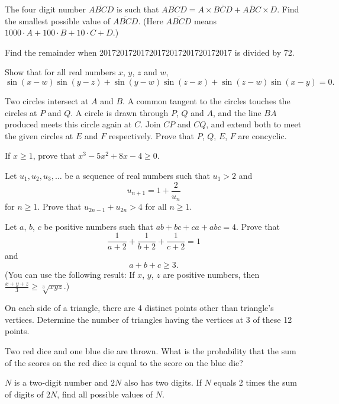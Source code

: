 \begin{problems}
    \problem The four digit number $\overline{ABCD}$ is such that
    $\overline{ABCD} = A \times \overline{BCD} + \overline{ABC} \times D$. Find
    the smallest possible value of $\overline{ABCD}$. (Here $\overline{ABCD}$
    means $1000 \cdot A + 100 \cdot B + 10 \cdot C + D$.)
    
    \problem Find the remainder when 20172017201720172017201720172017 is
    divided by 72. 
    
    \problem Show that for all real numbers $x$, $y$, $z$ and $w$, \[\sin(x -
    w)\sin(y - z) + \sin(y - w)\sin(z - x) + \sin(z - w)\sin(x - y) = 0.\]
    
    \problem Two circles intersect at $A$ and $B$. A common tangent to the
    circles touches the circles at $P$ and $Q$. A circle is drawn through $P$,
    $Q$ and $A$, and the line $BA$ produced meets this circle again at $C$.
    Join $CP$ and $CQ$, and extend both to meet the given circles at $E$ and
    $F$ respectively. Prove that $P$, $Q$, $E$, $F$ are concyclic. 
    
    \problem If $x \geq 1$, prove that $x^3 - 5x^2 + 8x - 4 \geq 0$. 
    
    \problem Let $u_{1}, u_{2}, u_{3}, \ldots$ be a sequence of real numbers
    such that $u_{1} > 2$ and 
    \[u_{n + 1} = 1 + \frac{2}{u_{n}}\] 
    for $n \geq 1$. Prove that $u_{2n - 1} + u_{2n} > 4$ for all $n \geq 1$. 
    
    \problem Let $a$, $b$, $c$ be positive numbers such that $ab + bc + ca +
    abc = 4$. Prove that 
    \[\frac{1}{a + 2} + \frac{1}{b + 2} + \frac{1}{c + 2} = 1\]
    and
    \[a + b + c \geq 3.\]
    (You can use the following result: If $x$, $y$, $z$ are positive numbers,
    then $\frac{x + y + z}{3} \geq \sqrt[3]{xyz}$.)
    
    \problem On each side of a triangle, there are 4 distinct points other than
    triangle's vertices. Determine the number of triangles having the vertices
    at 3 of these 12 points. 
    
    \problem Two red dice and one blue die are thrown. What is the probability
    that the sum of the scores on the red dice is equal to the score on the
    blue die? 
    
    \problem $N$ is a two-digit number and $2N$ also has two digits. If $N$
    equals 2 times the sum of digits of $2N$, find all possible values of $N$.
    

\end{problems}
